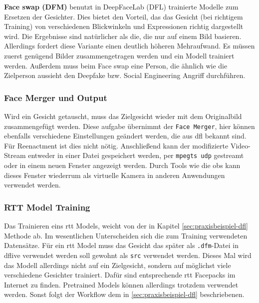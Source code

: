 \textbf{Face swap (DFM)} benutzt in DeepFaceLab (DFL) trainierte Modelle zum Ersetzen der Gesichter.
Dies bietet den Vorteil, das das Gesicht (bei richtigem Training) von verschiedenen Blickwinkeln und Expressionen richtig dargestellt wird.
Die Ergebnisse sind natürlicher als die, die nur auf einem Bild basieren.
Allerdings fordert diese Variante einen deutlich höheren Mehraufwand. 
Es müssen zuerst genügend Bilder zusammengetragen werden und ein Modell trainiert werden.
Außerdem muss beim Face swap eine Person, die ähnlich wie die Zielperson aussieht den Deepfake bzw. Social Engineering Angriff durchführen.

\subsubsection{Face Merger und Output}
Wird ein Gesicht getauscht, muss das Zielgesicht wieder mit dem Originalbild zusammengefügt werden.
Diese aufgabe übernimmt der \texttt{Face Merger}, hier können ebenfalls verschiedene Einstellungen geändert werden, die aus \gls{dfl} bekannt sind.
Für Reenactment ist dies nicht nötig.
Anschließend kann der modifizierte Video-Stream entweder in einer Datei gespeichert werden, per \texttt{mpegts udp} gestreamt oder in einem neuen Fenster angezeigt werden.
Durch Tools wie die \gls{obs} kann dieses Fenster wiederrum als virtuelle Kamera in anderen Anwendungen verwendet werden.

\subsubsection{RTT Model Training}
Das Trainieren eins \gls{rtt} Models, weicht von der in Kapitel \ref{sec:praxisbeispiel-dfl} Methode ab.
Im wesentlichen Unterscheiden sich die zum Training verwendeten Datensätze.
Für ein \gls{rtt} Model muss das Gesicht das später als \texttt{.dfm}-Datei in \gls{dflive} verwendet werden soll gewohnt als \texttt{src} verwendet werden.
Dieses Mal wird das Modell allerdings nicht auf ein Zielgesicht, sondern auf möglichst viele verschiedene Gesichter trainiert.
Dafür sind entsprechende \gls{rtt} Facepacks im Internet zu finden.
Pretrained Models können allerdings trotzdem verwendet werden.
Sonst folgt der Workflow dem in \ref{sec:praxisbeispiel-dfl} beschriebenen.